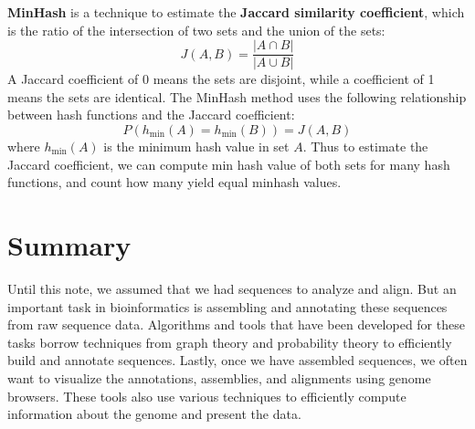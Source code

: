 \documentclass[12pt]{article}
\begin{document}
\textbf{MinHash} is a technique to estimate the \textbf{Jaccard similarity coefficient}, which is the ratio of the intersection of two sets and the union of the sets:
$$J(A,B) = \frac{|A \cap B|}{|A \cup B|}$$
A Jaccard coefficient of 0 means the sets are disjoint, while a coefficient of 1 means the sets are identical. The MinHash method uses the following relationship between hash functions and the Jaccard coefficient:
$$P(h_{\min}(A) = h_{\min}(B)) = J(A,B)$$
where $h_{\min}(A)$ is the minimum hash value in set $A$. Thus to estimate the Jaccard coefficient, we can compute min hash value of both sets for many hash functions, and count how many yield equal minhash values.

\section{Summary}
Until this note, we assumed that we had sequences to analyze and align. But an important task in bioinformatics is assembling and annotating these sequences from raw sequence data. Algorithms and tools that have been developed for these tasks borrow techniques from graph theory and probability theory to efficiently build and annotate sequences. Lastly, once we have assembled sequences, we often want to visualize the annotations, assemblies, and alignments using genome browsers. These tools also use various techniques to efficiently compute information about the genome and present the data.
\end{document}
